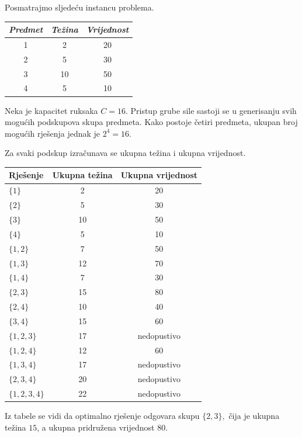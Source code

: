 \begin{solution}
	
	Posmatrajmo sljedeću instancu problema.
	
	\begin{center}
		\begin{tabular}{ccc}
			\emph{Predmet} & \emph{Težina} & \emph{Vrijednost} \\ \hline
			1 & 2  & 20 \\
			2 & 5  & 30 \\
			3 & 10 & 50 \\
			4 & 5  & 10 \\ \hline \hline
		\end{tabular}
	\end{center}
	
	Neka je kapacitet ruksaka $C=16.$	Pristup grube sile sastoji se u generisanju svih mogućih podskupova skupa predmeta. Kako postoje četiri predmeta, ukupan broj mogućih rješenja jednak je $2^4 = 16.$
	
	Za svaki podskup izračunava se ukupna težina i ukupna vrijednost.
	
	\begin{center}
		\begin{tabular}{lcc}
			Rješenje & Ukupna težina & Ukupna vrijednost \\ \hline
			$\{1\}$ & 2 & 20  \\
			$\{2\}$ & 5 & 30  \\
			$\{3\}$ & 10 & 50  \\
			$\{4\}$ & 5 & 10  \\
			$\{1,2\}$ & 7 & 50  \\
			$\{1,3\}$ & 12 & 70  \\
			$\{1,4\}$ & 7 & 30  \\
			$\{2,3\}$ & 15 & 80  \\
			$\{2,4\}$ & 10 & 40  \\
			$\{3,4\}$ & 15 & 60 \\
			$\{1,2,3\}$ & 17 & nedopustivo  \\
			$\{1,2,4\}$ & 12 & 60  \\
			$\{1,3,4\}$ & 17 & nedopustivo  \\
			$\{2,3,4\}$ & 20 & nedopustivo  \\
			$\{1,2,3,4\}$ & 22 & nedopustivo  \\ \hline
		\end{tabular}
	\end{center}
	
	Iz tabele se vidi da optimalno rješenje odgovara skupu $\{2,3\},$ čija je ukupna težina $15$, a ukupna pridružena vrijednost $80$.
	
\end{solution}

